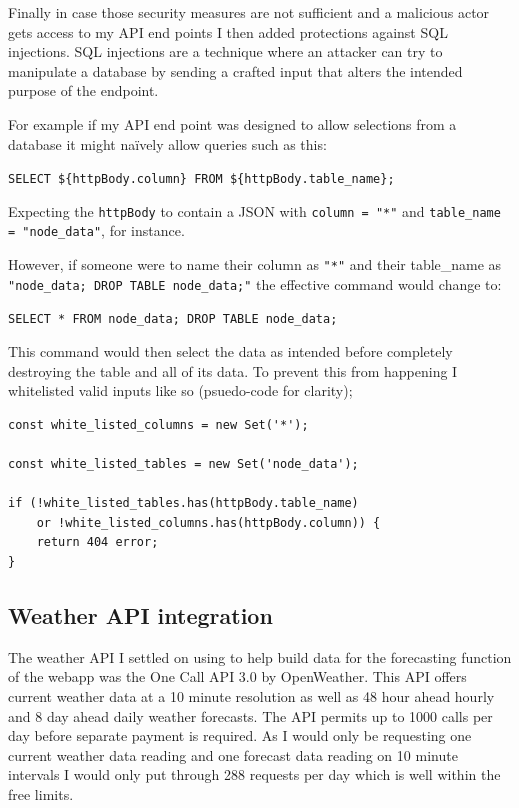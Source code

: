 Finally in case those security measures are not sufficient and a malicious actor
gets access to my API end points I then added protections against SQL
injections. SQL injections are a technique where an attacker can try to
manipulate a database by sending a crafted input that alters the intended
purpose of the endpoint.

For example if my API end point was designed to allow selections from a database
it might naïvely allow queries such as this:

\verb|SELECT ${httpBody.column} FROM ${httpBody.table_name};|

Expecting the \verb|httpBody| to contain a JSON with \texttt{column = "*"} and
\texttt{table\_name = "node\_data"}, for instance. 

However, if someone were to name their column as \texttt{"*"} and their
table\_name as \texttt{"node\_data; DROP TABLE node\_data;"} the effective
command would change to:

\verb|SELECT * FROM node_data; DROP TABLE node_data;|

This command would then select the data as intended before completely destroying
the table and all of its data. To prevent this from happening I whitelisted
valid inputs like so (psuedo-code for clarity);

\begin{verbatim}
const white_listed_columns = new Set('*');

const white_listed_tables = new Set('node_data');

if (!white_listed_tables.has(httpBody.table_name) 
    or !white_listed_columns.has(httpBody.column)) {
    return 404 error;
}
\end{verbatim}

\subsection{Weather API integration}

The weather API I settled on using to help build data for the forecasting
function of the webapp was the One Call API 3.0 by OpenWeather. This API offers
current weather data at a 10 minute resolution as well as 48 hour ahead hourly
and 8 day ahead daily weather forecasts. The API permits up to 1000 calls per
day before separate payment is required. As I would only be requesting one
current weather data reading and one forecast data reading on 10 minute
intervals I would only put through 288 requests per day which is well within the
free limits.


